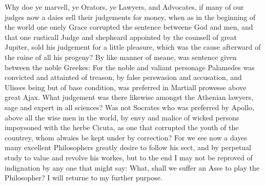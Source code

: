 Why doe ye marvell, ye Orators, ye Lawyers, and Advocates, if many of our
judges now a daies sell their judgements for money, when as in the beginning of
the world one onely Grace corrupted the sentence betweene God and men, and that
one rusticall Judge and shepheard appointed by the counsell of great Jupiter,
sold his judgement for a little pleasure, which was the cause afterward of the
ruine of all his progeny? By like manner of meane, was sentence given between
the noble Greekes: For the noble and valiant personage Palamedes was convicted
and attainted of treason, by false perswasion and accusation, and Ulisses being
but of base condition, was preferred in Martiall prowesse above great Ajax.
What judgement was there likewise amongst the Athenian lawyers, sage and expert
in all sciences? Was not Socrates who was preferred by Apollo, above all the
wise men in the world, by envy and malice of wicked persons impoysoned with the
herbe Cicuta, as one that corrupted the youth of the countrey, whom alwaies be
kept under by correction? For we see now a dayes many excellent Philosophers
greatly desire to follow his sect, and by perpetual study to value and revolve
his workes, but to the end I may not be reproved of indignation by any one that
might say: What, shall we suffer an Asse to play the Philosopher? I will
returne to my further purpose.

